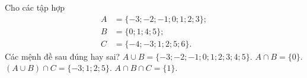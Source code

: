 \begin{ex}
Cho các tập hợp
\begin{align*}
A&=\{-3;-2;-1;0;1;2;3\};\\
B&=\{0;1;4;5\};\\
C&=\{-4;-3;1;2;5;6\}.
\end{align*}
Các mệnh đề sau đúng hay sai?
\choiceTF
{\True $A\cup B=\{-3;-2;-1;0;1;2;3;4;5\}$.}
{$A\cap B=\{0\}$.}
{\True $(A\cup B)\cap C=\{-3;1;2;5\}$.}
{\True $A\cap B\cap C=\{1\}$.}
\end{ex}
